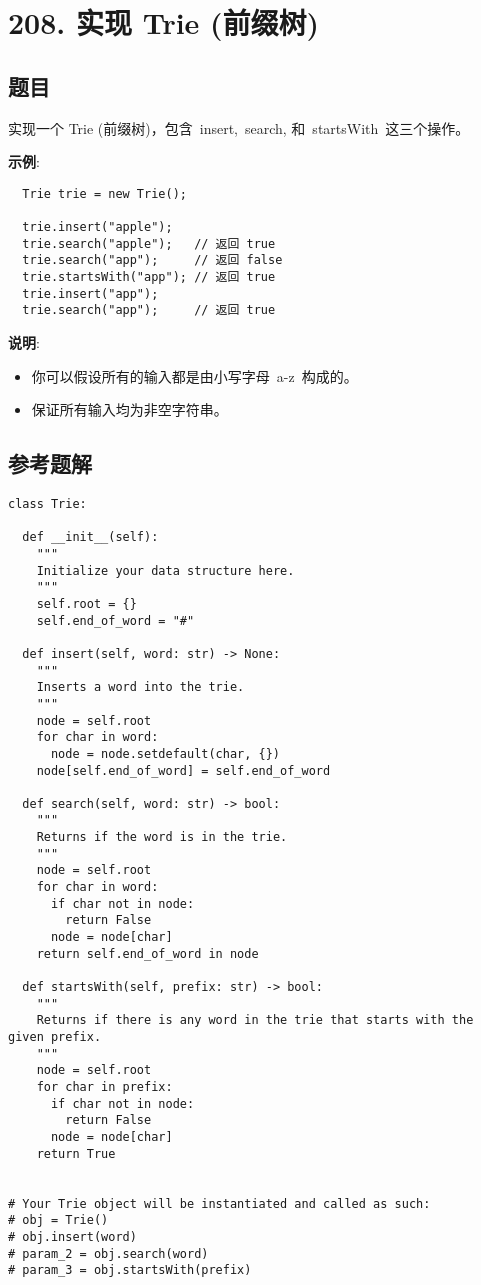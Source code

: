 \newpage
\section{208. 实现 Trie (前缀树)}
\label{leetcode:208}

\subsection{题目}

实现一个 Trie (前缀树)，包含 insert, search, 和 startsWith 这三个操作。

\textbf{示例}:

\begin{verbatim}
  Trie trie = new Trie();

  trie.insert("apple");
  trie.search("apple");   // 返回 true
  trie.search("app");     // 返回 false
  trie.startsWith("app"); // 返回 true
  trie.insert("app");
  trie.search("app");     // 返回 true
\end{verbatim}

\textbf{说明}:

\begin{itemize}
  \item 你可以假设所有的输入都是由小写字母 a-z 构成的。
  \item 保证所有输入均为非空字符串。
\end{itemize}

\subsection{参考题解}

\begin{verbatim}
class Trie:

  def __init__(self):
    """
    Initialize your data structure here.
    """
    self.root = {}
    self.end_of_word = "#"

  def insert(self, word: str) -> None:
    """
    Inserts a word into the trie.
    """
    node = self.root
    for char in word:
      node = node.setdefault(char, {})
    node[self.end_of_word] = self.end_of_word

  def search(self, word: str) -> bool:
    """
    Returns if the word is in the trie.
    """
    node = self.root
    for char in word:
      if char not in node:
        return False
      node = node[char]
    return self.end_of_word in node

  def startsWith(self, prefix: str) -> bool:
    """
    Returns if there is any word in the trie that starts with the given prefix.
    """
    node = self.root
    for char in prefix:
      if char not in node:
        return False
      node = node[char]
    return True


# Your Trie object will be instantiated and called as such:
# obj = Trie()
# obj.insert(word)
# param_2 = obj.search(word)
# param_3 = obj.startsWith(prefix)
\end{verbatim}

